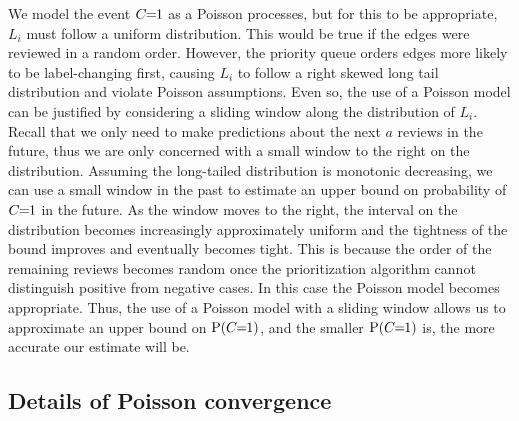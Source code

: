 We model the event $C\mkern-6mu=\mkern-6mu1$ as a Poisson processes, but for this to be appropriate, $L_i$ must follow a uniform
  distribution.
This would be true if the edges were reviewed in a random order.
However, the priority queue orders edges more likely to be label-changing first, causing $L_i$ to follow a right
  skewed long tail distribution and violate Poisson assumptions.
Even so, the use of a Poisson model can be justified by considering a sliding window along the distribution of
  $L_i$.
Recall that we only need to make predictions about the next $a$ reviews in the future, thus we are only concerned
  with a small window to the right on the distribution.
Assuming the long-tailed distribution is monotonic decreasing, we can use a small window in the past to estimate
  an upper bound on probability of $C\mkern-6mu=\mkern-6mu1$ in the future.
As the window moves to the right, the interval on the distribution becomes increasingly approximately uniform and
  the tightness of the bound improves and eventually becomes tight.
This is because the order of the remaining reviews becomes random once the prioritization algorithm cannot
  distinguish positive from negative cases.
In this case the Poisson model becomes appropriate.
Thus, the use of a Poisson model with a sliding window allows us to approximate an upper bound on $\mathbin{\operatorname{P}}(C\mkern-6mu=\mkern-6mu1)$,
  and the smaller $\mathbin{\operatorname{P}}(C\mkern-6mu=\mkern-6mu1)$ is, the more accurate our estimate will be.


\subsection{Details of Poisson convergence}

